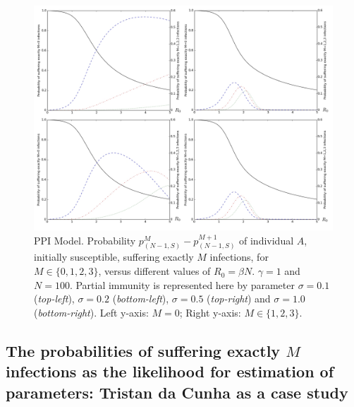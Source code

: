 \documentclass[preprint,12pt]{elsarticle}
\begin{document}
\begin{figure}[h!]
  \centering
 \includegraphics[width=\textwidth]{SIRI.jpg}
 \caption{PPI Model. Probability $p_{(N-1,S)}^M-p_{(N-1,S)}^{M+1}$ of individual $A$, initially susceptible, suffering exactly $M$ infections, for $M\in\{0,1,2,3\}$, versus different values of $R_0=\beta N$. $\gamma=1$ and $N=100$.
Partial immunity is represented here by parameter $\sigma=0.1$ ({\it top-left}), $\sigma=0.2$ ({\it bottom-left}), $\sigma=0.5$ ({\it top-right}) and
$\sigma=1.0$ ({\it bottom-right}). Left y-axis: $M=0$; Right y-axis: $M\in\{1,2,3\}$.}
 \label{fig:siri}
\end{figure}


\subsection{The probabilities of suffering exactly $M$ infections as the likelihood for estimation of parameters: Tristan da Cunha as a case study}
\label{SubSect32}
\end{document}

